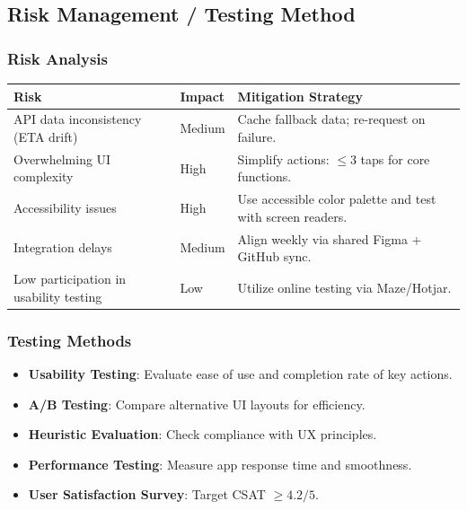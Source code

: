 \subsection{Risk Management / Testing Method}
\subsubsection{Risk Analysis}
\renewcommand{\arraystretch}{1.12}
\begin{tabularx}{\textwidth}{|>{\raggedright\arraybackslash}p{3.5cm}|>{\raggedright\arraybackslash}p{2.6cm}|>{\raggedright\arraybackslash}X|}
\hline
	\textbf{Risk} & \textbf{Impact} & \textbf{Mitigation Strategy} \\
\hline
API data inconsistency (ETA drift) & Medium & Cache fallback data; re-request on failure. \\
\hline
Overwhelming UI complexity & High & Simplify actions: $\le 3$ taps for core functions. \\
\hline
Accessibility issues & High & Use accessible color palette and test with screen readers. \\
\hline
Integration delays & Medium & Align weekly via shared Figma + GitHub sync. \\
\hline
Low participation in usability testing & Low & Utilize online testing via Maze/Hotjar. \\
\hline
\end{tabularx}

\subsubsection{Testing Methods}
\begin{itemize}
  \item \textbf{Usability Testing}: Evaluate ease of use and completion rate of key actions.
  \item \textbf{A/B Testing}: Compare alternative UI layouts for efficiency.
  \item \textbf{Heuristic Evaluation}: Check compliance with UX principles.
  \item \textbf{Performance Testing}: Measure app response time and smoothness.
  \item \textbf{User Satisfaction Survey}: Target CSAT $\ge 4.2/5$.
\end{itemize}

